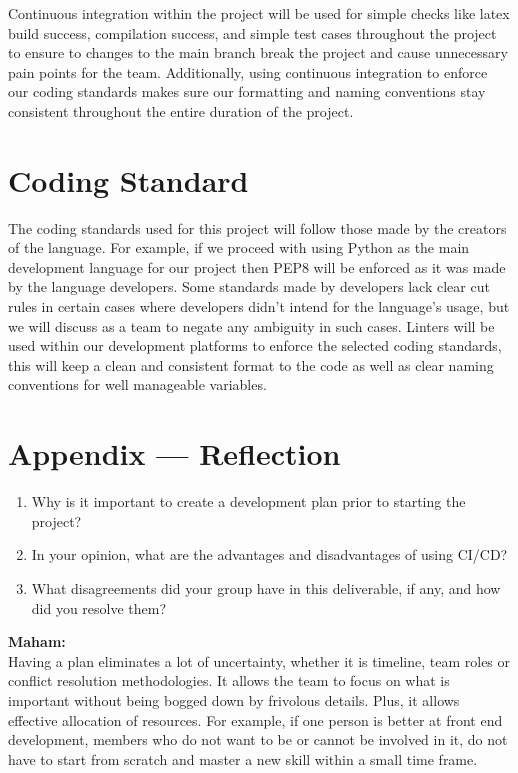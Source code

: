 \documentclass{article}
\begin{document}
Continuous integration within the project will be used for simple checks like latex build success, compilation success, and simple test cases throughout the project to ensure to changes to the main branch break the project and cause unnecessary pain points for the team. Additionally, using continuous integration to enforce our coding standards makes sure our formatting and naming conventions stay consistent throughout the entire duration of the project.

\section{Coding Standard}

The coding standards used for this project will follow those made by the creators of the language. For example, if we proceed with using Python as the main development language for our project then PEP8 will be enforced as it was made by the language developers. Some standards made by developers lack clear cut rules in certain cases where developers didn’t intend for the language’s usage, but we will discuss as a team to negate any ambiguity in such cases.
Linters will be used within our development platforms to enforce the selected coding standards, this will keep a clean and consistent format to the code as well as clear naming conventions for well manageable variables.

\newpage{}

\section*{Appendix --- Reflection}

\begin{enumerate}
    \item Why is it important to create a development plan prior to starting the
    project?
    \item In your opinion, what are the advantages and disadvantages of using
    CI/CD?
    \item What disagreements did your group have in this deliverable, if any,
    and how did you resolve them?
\end{enumerate}
\textbf{Maham:} \\
Having a plan eliminates a lot of uncertainty, whether it is timeline, team roles or conflict resolution methodologies. It allows the team to focus on what is important without being bogged down by frivolous details. Plus, it allows effective allocation of resources. For example, if one person is better at front end development, members who do not want to be or cannot be involved in it, do not have to start from scratch and master a new skill within a small time frame. 
\end{document}
